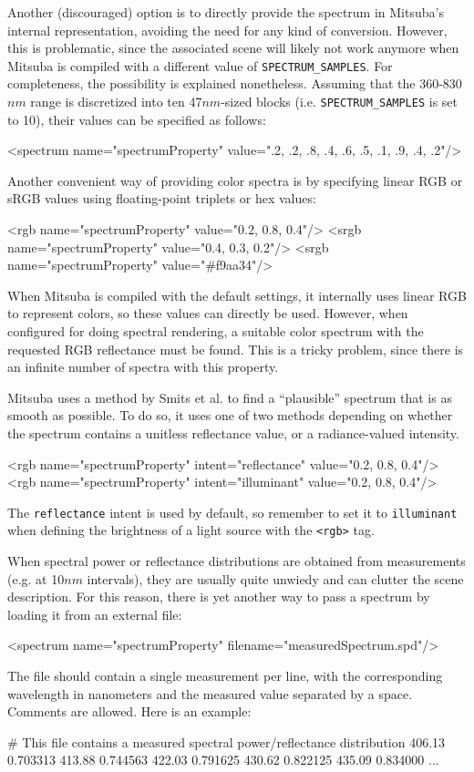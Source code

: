 Another (discouraged) option is to directly provide the spectrum in Mitsuba's
internal representation, avoiding the need for any kind of conversion. 
However, this is problematic, since the associated scene will likely not work
anymore when Mitsuba is compiled with a different value of 
\texttt{SPECTRUM\_SAMPLES}. 
For completeness, the possibility is explained nonetheless. Assuming that 
the 360-830$nm$ range is discretized into ten 47$nm$-sized blocks 
(i.e. \texttt{SPECTRUM\_SAMPLES} is set to 10), their values can be specified 
as follows:
\begin{xml}
<spectrum name="spectrumProperty" value=".2, .2, .8, .4, .6, .5, .1, .9, .4, .2"/>
\end{xml}

Another convenient way of providing color spectra is by specifying linear RGB 
or sRGB values using floating-point triplets or hex values:
\begin{xml}
<rgb name="spectrumProperty" value="0.2, 0.8, 0.4"/>
<srgb name="spectrumProperty" value="0.4, 0.3, 0.2"/>
<srgb name="spectrumProperty" value="#f9aa34"/>
\end{xml}
When Mitsuba is compiled with the default settings, it internally uses 
linear RGB to represent colors, so these values can directly be used. 
However, when configured for doing spectral rendering, a suitable color
spectrum with the requested RGB reflectance must be found. This is a tricky
problem, since there is an infinite number of spectra with this property.

Mitsuba uses a method by Smits et al. \cite{Smits2005RGB} to find a
``plausible'' spectrum that is as smooth as possible. To do so, it uses
one of two methods depending on whether the spectrum contains a
unitless reflectance value, or a radiance-valued intensity.
\begin{xml}
<rgb name="spectrumProperty" intent="reflectance" value="0.2, 0.8, 0.4"/>
<rgb name="spectrumProperty" intent="illuminant" value="0.2, 0.8, 0.4"/>
\end{xml}
The \texttt{reflectance} intent is used by default, so remember to
set it to \texttt{illuminant} when defining the brightness of a
light source with the \texttt{<rgb>} tag.

When spectral power or reflectance distributions are obtained from measurements 
(e.g. at 10$nm$ intervals), they are usually quite unwiedy and can clutter
the scene description. For this reason, there is yet another way to pass 
a spectrum by loading it from an external file:
\begin{xml}
<spectrum name="spectrumProperty" filename="measuredSpectrum.spd"/>
\end{xml}
The file should contain a single measurement per line, with the corresponding
wavelength in nanometers and the measured value separated by a space. Comments
are allowed. Here is an example:
\begin{xml}
# This file contains a measured spectral power/reflectance distribution
406.13 0.703313
413.88 0.744563
422.03 0.791625
430.62 0.822125
435.09 0.834000
...
\end{xml}

